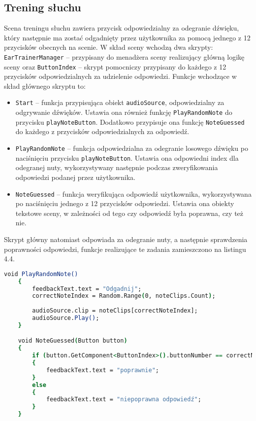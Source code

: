 \subsection{Trening słuchu}

Scena treningu słuchu zawiera przycisk odpowiedzialny za odegranie dźwięku, który następnie ma zostać odgadnięty przez użytkownika za pomocą jednego z 12 przycisków obecnych na scenie. W skład sceny wchodzą dwa skrypty: \texttt{EarTrainerManager} -- przypisany do menadżera sceny realizujący główną logikę sceny oraz \texttt{ButtonIndex} -- skrypt pomocniczy przypisany do każdego z 12 przycisków odpowiedzialnych za udzielenie odpowiedzi. Funkcje wchodzące w skład głównego skryptu to:
\begin{itemize}
    \item \texttt{Start} -- funkcja przypisująca obiekt \texttt{audioSource}, odpowiedzialny za odgrywanie dźwięków. Ustawia ona również funkcję \texttt{PlayRandomNote} do przycisku \texttt{playNoteButton}. Dodatkowo przypisuje ona funkcję \texttt{NoteGuessed} do każdego z przycisków odpowiedzialnych za odpowiedź.
    \item \texttt{PlayRandomNote} -- funkcja odpowiedzialna za odegranie losowego dźwięku po naciśnięciu przycisku \texttt{playNoteButton}. Ustawia ona odpowiedni index dla odegranej nuty, wykorzystywany następnie podczas zweryfikowania odpowiedzi podanej przez użytkownika.
    \item \texttt{NoteGuessed} -- funkcja weryfikująca odpowiedź użytkownika, wykorzystywana po naciśnięciu jednego z 12 przycisków odpowiedzi. Ustawia ona obiekty tekstowe sceny, w zależności od tego czy odpowiedź była poprawna, czy też nie. 
\end{itemize}

Skrypt główny natomiast odpowiada za odegranie nuty, a następnie sprawdzenia poprawności odpowiedzi, funkcje realizujące te zadania zamieszczono na listingu 4.4.

\begin{lstlisting}[language=csh,caption=Funkcje \texttt{PlayRandomNote} i \texttt{NoteGuessed}, label=lst:4]
    void PlayRandomNote()
    {
        feedbackText.text = "Odgadnij"; 
        correctNoteIndex = Random.Range(0, noteClips.Count);
        
        audioSource.clip = noteClips[correctNoteIndex];
        audioSource.Play();
    }

    void NoteGuessed(Button button)
    {
        if (button.GetComponent<ButtonIndex>().buttonNumber == correctNoteIndex)
        {
            feedbackText.text = "poprawnie";
        }
        else
        {
            feedbackText.text = "niepoprawna odpowiedź";
        }
    }
\end{lstlisting}

